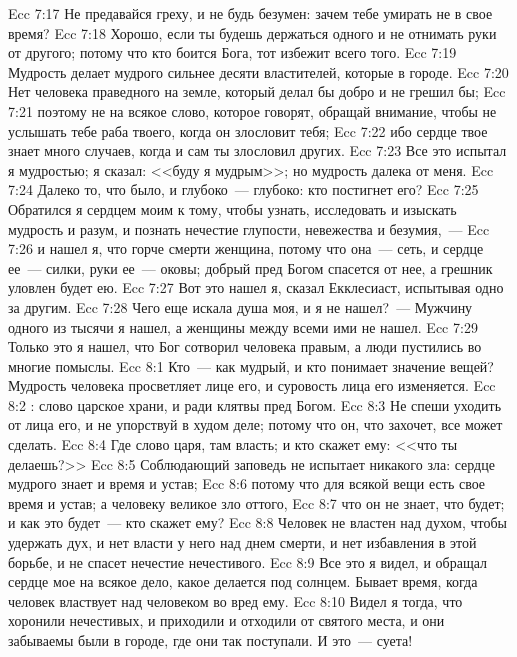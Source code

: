 \vs Ecc 7:17 Не предавайся греху, и не будь безумен: зачем тебе умирать не в свое время?
\vs Ecc 7:18 Хорошо, если ты будешь держаться одного и не отнимать руки от другого; потому что кто боится Бога, тот избежит всего того.
\vs Ecc 7:19 Мудрость делает мудрого сильнее десяти властителей, которые в городе.
\rsbpar\vs Ecc 7:20 Нет человека праведного на земле, который делал бы добро и не грешил бы;
\vs Ecc 7:21 поэтому не на всякое слово, которое говорят, обращай внимание, чтобы не услышать тебе раба твоего, когда он злословит тебя;
\vs Ecc 7:22 ибо сердце твое знает много случаев, когда и сам ты злословил других.
\rsbpar\vs Ecc 7:23 Все это испытал я мудростью; я сказал: <<буду я мудрым>>; но мудрость далека от меня.
\vs Ecc 7:24 Далеко то, что было, и глубоко~--- глубоко: кто постигнет его?
\vs Ecc 7:25 Обратился я сердцем моим к тому, чтобы узнать, исследовать и изыскать мудрость и разум, и познать нечестие глупости, невежества и безумия,~---
\vs Ecc 7:26 и нашел я, что горче смерти женщина, потому что она~--- сеть, и сердце ее~--- силки, руки ее~--- оковы; добрый пред Богом спасется от нее, а грешник уловлен будет ею.
\vs Ecc 7:27 Вот это нашел я, сказал Екклесиаст, испытывая одно за другим.
\vs Ecc 7:28 Чего еще искала душа моя, и я не нашел?~--- Мужчину одного из тысячи я нашел, а женщины между всеми ими не нашел.
\vs Ecc 7:29 Только это я нашел, что Бог сотворил человека правым, а люди пустились во многие помыслы.
\vs Ecc 8:1 Кто~--- как мудрый, и кто понимает значение вещей? Мудрость человека просветляет лице его, и суровость лица его изменяется.
\vs Ecc 8:2 : слово царское храни, и  ради клятвы пред Богом.
\vs Ecc 8:3 Не спеши уходить от лица его, и не упорствуй в худом деле; потому что он, что захочет, все может сделать.
\vs Ecc 8:4 Где слово царя, там власть; и кто скажет ему: <<что ты делаешь?>>
\rsbpar\vs Ecc 8:5 Соблюдающий заповедь не испытает никакого зла: сердце мудрого знает и время и устав;
\vs Ecc 8:6 потому что для всякой вещи есть свое время и устав; а человеку великое зло оттого,
\vs Ecc 8:7 что он не знает, что будет; и как это будет~--- кто скажет ему?
\rsbpar\vs Ecc 8:8 Человек не властен над духом, чтобы удержать дух, и нет власти у него над днем смерти, и нет избавления в этой борьбе, и не спасет нечестие нечестивого.
\vs Ecc 8:9 Все это я видел, и обращал сердце мое на всякое дело, какое делается под солнцем. Бывает время, когда человек властвует над человеком во вред ему.
\vs Ecc 8:10 Видел я тогда, что хоронили нечестивых, и приходили и отходили от святого места, и они забываемы были в городе, где они так поступали. И это~--- суета!
